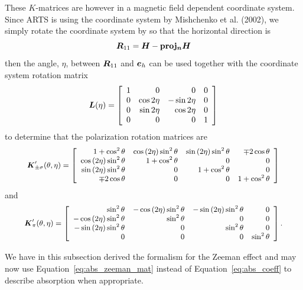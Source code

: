 These {\boldmath$K$}-matrices are however in a magnetic field dependent coordinate system. Since ARTS is using the coordinate system by Mishchenko et al. (2002), we simply rotate the coordinate system by so that the horizontal direction is
$$\mbox{\boldmath$R$}_{11} = \mbox{\boldmath$H$}-\mbox{\textbf{proj}}\mbox{\boldmath$_n$}\mbox{\boldmath$H$}$$
then the angle, $\eta$, between $\mbox{\boldmath$R$}_{11}$ and $\mbox{\boldmath$e$}_{h}$ can be used together with the coordinate system rotation matrix
\begin{equation}
 \mbox{\boldmath$L$}(\eta) = 
\left[
\begin{array}{rrrr}
 1&0&0&0\\
0&\cos 2\eta& -\sin 2\eta&0\\
0&\sin 2\eta& \cos 2\eta &0\\
0&0&0&1
\end{array}
\right]
\end{equation}
to determine that the polarization rotation matrices are
\begin{equation}\small
 \mbox{\boldmath$K$}'_{\pm\sigma}(\theta,\eta) = \left[
\begin{array}{rrrr}
1+\cos^2\theta & \cos\left(2\eta\right)\sin^2\theta &  \sin\left(2\eta\right)\sin^2\theta&\mp 2\cos\theta\\
\cos\left(2\eta\right)\sin^2\theta&1+\cos^2\theta&0&0\\
\sin\left(2\eta\right)\sin^2\theta&0&1+\cos^2\theta&0\\
\mp 2\cos\theta&0&0&1+\cos^2\theta
\end{array}
\right]
\end{equation}
and
\begin{equation}\small
 \mbox{\boldmath$K$}'_\pi(\theta,\eta) = \left[
\begin{array}{rrrr}
\sin^2\theta & -\cos\left(2\eta\right)\sin^2\theta &  -\sin\left(2\eta\right)\sin^2\theta&0\\
-\cos\left(2\eta\right)\sin^2\theta&\sin^2\theta&0&0\\
-\sin\left(2\eta\right)\sin^2\theta&0&\sin^2\theta&0\\
0&0&0&\sin^2\theta
\end{array}
\right].
\end{equation}

We have in this subsection derived the formalism for the Zeeman effect and may now use Equation~\ref{eq:abs_zeeman_mat} instead of Equation~\ref{eq:abs_coeff} to describe absorption when appropriate.

